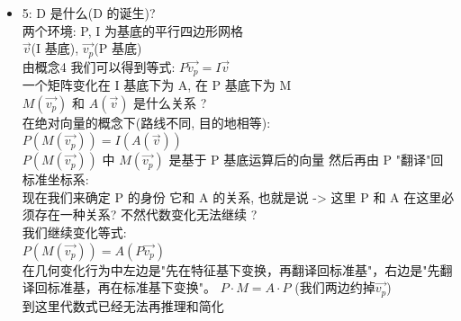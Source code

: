 \documentclass[12pt]{article}
\begin{document}
\begin{flushleft}
\begin{itemize}
              那么 $\vec{v_{p}} = \begin{bmatrix}
                      x1 \\
                      x2
                  \end{bmatrix}$ \\
              $P \cdot \vec{v_{p}} = x1(a \cdot e1 + b \cdot e2) + x2( c \cdot e1 + d \cdot e2)$ \\
              = $a\cdot e1 \cdot x1  +  b \cdot e2 \cdot x1  + c \cdot e1 \cdot x2  + d \cdot e2 \cdot x2$ \\
              = $(a\cdot e1 \cdot x1 +  c \cdot e1 \cdot x2 ) + (b \cdot e2 \cdot x1  + d \cdot e2 \cdot x2) $ \\
              = $e1(ax1 + cx2) + e2(bx1 + dx2)$ \\
              我们回到了非常经典的标准基代数表达式 \\
              所以我们就可以得到 P 是 从特征基坐标 → 标准基坐标的翻译器 \\
        \item 5: D 是什么(D 的诞生)? \\
              两个环境: P, I 为基底的平行四边形网格 \\
              $\vec{v}$(I 基底), $\vec{v_{p}}$(P 基底) \\
              由概念4 我们可以得到等式:  $P\vec{v_p} = I\vec{v}$ \\
              一个矩阵变化在 I 基底下为 A, 在 P 基底下为 M  \\
              $M(\vec{v_p})$ 和 $A(\vec{v})$ 是什么关系 ? \\
              在绝对向量的概念下(路线不同, 目的地相等): \\
              $P(M(\vec{v_p})) =  I(A(\vec{v}))$ \\
              $P(M(\vec{v_p}))$ 中 $M(\vec{v_p})$ 是基于 P 基底运算后的向量 然后再由 P "翻译"回 标准坐标系:\\
              现在我们来确定 P 的身份 它和 A 的关系, 也就是说 -> 这里 P 和 A 在这里必须存在一种关系?  不然代数变化无法继续 ? \\
              我们继续变化等式:\\
              $P(M(\vec{v_p})) =  A (P\vec{v_p})$ \\
              在几何变化行为中左边是"先在特征基下变换，再翻译回标准基"，右边是"先翻译回标准基，再在标准基下变换"。
              $P \cdot M  = A \cdot P$ (我们两边约掉$\vec{v_{p}}$) \\
              到这里代数式已经无法再推理和简化 \\

\end{itemize}
\end{flushleft}
\end{document}

